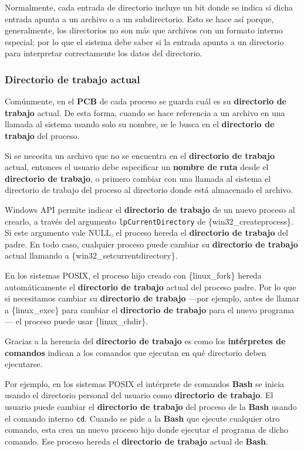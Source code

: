 Normalmente, cada entrada de directorio incluye un bit donde se indica
si dicha entrada apunta a un archivo o a un subdirectorio. Esto se hace
así porque, generalmente, los directorios no son más que archivos con un
formato interno especial; por lo que el sistema debe saber si la entrada
apunta a un directorio para interpretar correctamente los datos del
directorio.

\subsubsection{Directorio de trabajo
actual}\label{_directorio_de_trabajo_actual}

{} Comúnmente, en el \textbf{PCB} de cada proceso se guarda cuál es su
\textbf{directorio de trabajo} actual. De esta forma, cuando se hace
referencia a un archivo en una llamada al sistema usando solo su nombre,
se le busca en el \textbf{directorio de trabajo} del proceso.

Si se necesita un archivo que no se encuentra en el \textbf{directorio
de trabajo} actual, entonces el usuario debe especificar un
\textbf{nombre de ruta} desde el \textbf{directorio de trabajo}, o
primero cambiar con una llamada al sistema el directorio de trabajo del
proceso al directorio donde está almacenado el archivo.

Windows API permite indicar el \textbf{directorio de trabajo} de un
nuevo proceso al crearlo, a través del argumento
\texttt{lpCurrentDirectory} de \{win32\_createprocess\}. Si este
argumento vale NULL, el proceso hereda el \textbf{directorio de trabajo}
del padre. En todo caso, cualquier proceso puede cambiar su
\textbf{directorio de trabajo} actual llamando a
\{win32\_setcurrentdirectory\}.

En los sistemas POSIX, el proceso hijo creado con \{linux\_fork\} hereda
automáticamente el \textbf{directorio de trabajo} actual del proceso
padre. Por lo que si necesitamos cambiar su \textbf{directorio de
trabajo} ---por ejemplo, antes de llamar a \{linux\_exec\} para cambiar
el \textbf{directorio de trabajo} para el nuevo programa--- el proceso
puede usar \{linux\_chdir\}.

Gracias a la herencia del \textbf{directorio de trabajo} es como los
\textbf{intérpretes de comandos} indican a los comandos que ejecutan en
qué directorio deben ejecutarse.

Por ejemplo, en los sistemas POSIX el intérprete de comandos
\textbf{Bash} se inicia usando el directorio personal del usuario como
\textbf{directorio de trabajo}. El usuario puede cambiar el
\textbf{directorio de trabajo} del proceso de la \textbf{Bash} usando el
comando interno \texttt{cd}. Cuando se pide a la \textbf{Bash} que
ejecute cualquier otro comando, esta crea un nuevo proceso hijo donde
ejecutar el programa de dicho comando. Ese proceso hereda el
\textbf{directorio de trabajo} actual de \textbf{Bash}.


